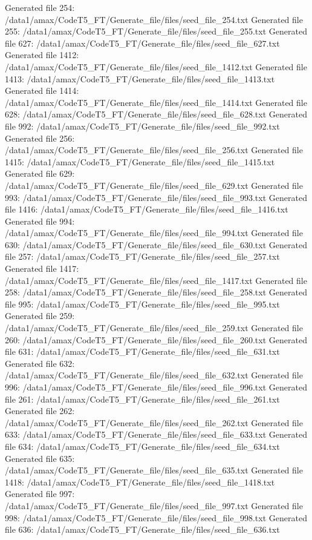Generated file 254: /data1/amax/CodeT5_FT/Generate_file/files/seed_file_254.txt
Generated file 255: /data1/amax/CodeT5_FT/Generate_file/files/seed_file_255.txt
Generated file 627: /data1/amax/CodeT5_FT/Generate_file/files/seed_file_627.txt
Generated file 1412: /data1/amax/CodeT5_FT/Generate_file/files/seed_file_1412.txt
Generated file 1413: /data1/amax/CodeT5_FT/Generate_file/files/seed_file_1413.txt
Generated file 1414: /data1/amax/CodeT5_FT/Generate_file/files/seed_file_1414.txt
Generated file 628: /data1/amax/CodeT5_FT/Generate_file/files/seed_file_628.txt
Generated file 992: /data1/amax/CodeT5_FT/Generate_file/files/seed_file_992.txt
Generated file 256: /data1/amax/CodeT5_FT/Generate_file/files/seed_file_256.txt
Generated file 1415: /data1/amax/CodeT5_FT/Generate_file/files/seed_file_1415.txt
Generated file 629: /data1/amax/CodeT5_FT/Generate_file/files/seed_file_629.txt
Generated file 993: /data1/amax/CodeT5_FT/Generate_file/files/seed_file_993.txt
Generated file 1416: /data1/amax/CodeT5_FT/Generate_file/files/seed_file_1416.txt
Generated file 994: /data1/amax/CodeT5_FT/Generate_file/files/seed_file_994.txt
Generated file 630: /data1/amax/CodeT5_FT/Generate_file/files/seed_file_630.txt
Generated file 257: /data1/amax/CodeT5_FT/Generate_file/files/seed_file_257.txt
Generated file 1417: /data1/amax/CodeT5_FT/Generate_file/files/seed_file_1417.txt
Generated file 258: /data1/amax/CodeT5_FT/Generate_file/files/seed_file_258.txt
Generated file 995: /data1/amax/CodeT5_FT/Generate_file/files/seed_file_995.txt
Generated file 259: /data1/amax/CodeT5_FT/Generate_file/files/seed_file_259.txt
Generated file 260: /data1/amax/CodeT5_FT/Generate_file/files/seed_file_260.txt
Generated file 631: /data1/amax/CodeT5_FT/Generate_file/files/seed_file_631.txt
Generated file 632: /data1/amax/CodeT5_FT/Generate_file/files/seed_file_632.txt
Generated file 996: /data1/amax/CodeT5_FT/Generate_file/files/seed_file_996.txt
Generated file 261: /data1/amax/CodeT5_FT/Generate_file/files/seed_file_261.txt
Generated file 262: /data1/amax/CodeT5_FT/Generate_file/files/seed_file_262.txt
Generated file 633: /data1/amax/CodeT5_FT/Generate_file/files/seed_file_633.txt
Generated file 634: /data1/amax/CodeT5_FT/Generate_file/files/seed_file_634.txt
Generated file 635: /data1/amax/CodeT5_FT/Generate_file/files/seed_file_635.txt
Generated file 1418: /data1/amax/CodeT5_FT/Generate_file/files/seed_file_1418.txt
Generated file 997: /data1/amax/CodeT5_FT/Generate_file/files/seed_file_997.txt
Generated file 998: /data1/amax/CodeT5_FT/Generate_file/files/seed_file_998.txt
Generated file 636: /data1/amax/CodeT5_FT/Generate_file/files/seed_file_636.txt
